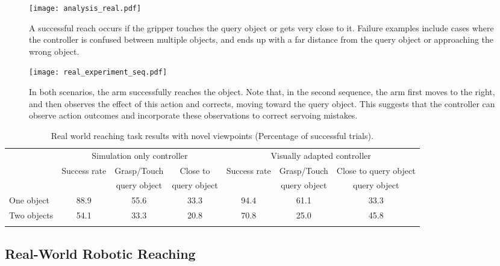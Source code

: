 \documentclass[10pt,twocolumn,letterpaper]{article}
\begin{document}
\begin{figure}[t]
\begin{center}
\texttt{[image: analysis\_real.pdf]}
\end{center}
\vspace{-.2in}
   \caption{A successful reach occurs if the gripper touches the query object or gets very close to it. Failure examples include cases where the controller is confused between multiple objects, and ends up with a far distance from the query object or approaching the wrong object.}
   \vspace{-.15in}
\label{fig:real_analysis}
\end{figure}\begin{figure*}[t]
\begin{center}
\texttt{[image: real\_experiment\_seq.pdf]}
\end{center}
\vspace{-.15in}
   \caption{In both scenarios, the arm successfully reaches the object. Note that, in the second sequence, the arm first moves to the right, and then observes the effect of this action and corrects, moving toward the query object. This suggests that the controller can observe action outcomes and incorporate these observations to correct servoing mistakes.}
\label{fig:real_self_calibration}
\vspace{-.1in}
\end{figure*}\begin{table*}
\begin{small}
\begin{center}
\caption{\small Real world reaching task results with novel viewpoints (Percentage of successful trials).\vspace{-.05in} \label{tab:real_exp}}
\renewcommand*{\arraystretch}{0.9}
\begin{tabular}[10pt]{lcccccc}
\toprule
  \multirow{3}{*}{}& \multicolumn{3}{c}{Simulation only controller} & \multicolumn{3}{c}{Visually adapted controller} \\\cline{2-7}
 
  & \multirow{2}{*}{Success rate} &{Grasp/Touch} & {Close to} & \multirow{2}{*}{Success rate} &{Grasp/Touch} & {Close to query object} \\
    & {} &{query object} & {query object} & {} &{query object} & {query object} \\
\midrule{One object}        & {88.9} & {55.6}& {33.3} & {94.4} & {61.1} & {33.3} \\
{Two objects}      & {54.1} & {33.3}& {20.8} & {70.8} & {25.0} & {45.8} \\
\bottomrule
\vspace{-.3in}
\end{tabular}
\end{center}
\end{small}
\end{table*}\subsection{Real-World Robotic Reaching}
\end{document}
